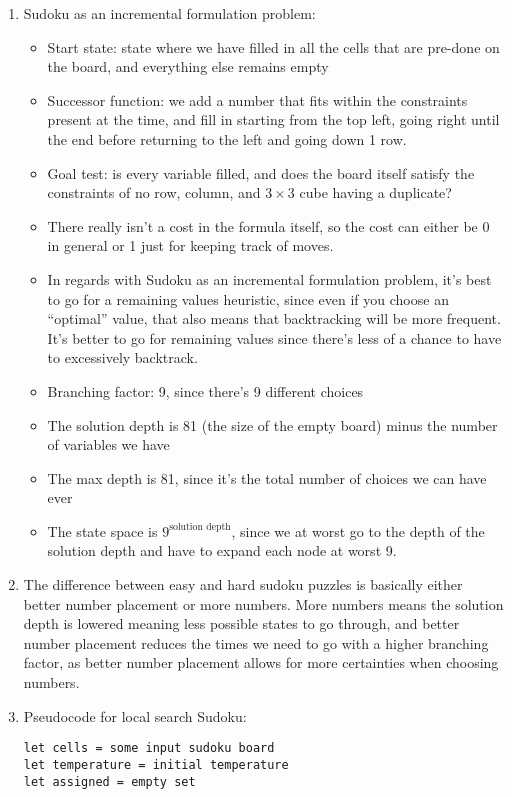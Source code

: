 \documentclass[12pt]{article}
\begin{document}
\begin{enumerate}[label={\large\textbf{\alph*)}}]
\item Sudoku as an incremental formulation problem:
\begin{itemize}
\item Start state: state where we have filled in all the cells that are pre-done on the board, and everything else remains empty
\item Successor function: we add a number that fits within the constraints present at the time, and fill in starting from the top left, going right until the end before returning to the left and going down 1 row.
\item Goal test: is every variable filled, and does the board itself satisfy the constraints of no row, column, and $3 \times 3$ cube having a duplicate?
\item There really isn't a cost in the formula itself, so the cost can either be 0 in general or 1 just for keeping track of moves.
\item In regards with Sudoku as an incremental formulation problem, it's best to go for a remaining values heuristic, since even if you choose an ``optimal'' value, that also means that backtracking will be more frequent. It's better to go for remaining values since there's less of a chance to have to excessively backtrack.
\item Branching factor: 9, since there's 9 different choices
\item The solution depth is 81 (the size of the empty board) minus the number of variables we have
\item The max depth is 81, since it's the total number of choices we can have ever
\item The state space is $9^{\text{solution depth}}$, since we at worst go to the depth of the solution depth and have to expand each node at worst 9.
\end{itemize}
\item The difference between easy and hard sudoku puzzles is basically either better number placement or more numbers. More numbers means the solution depth is lowered meaning less possible states to go through, and better number placement reduces the times we need to go with a higher branching factor, as better number placement allows for more certainties when choosing numbers.
\pagebreak
\item Pseudocode for local search Sudoku:
\begin{verbatim}
let cells = some input sudoku board
let temperature = initial temperature
let assigned = empty set


\end{verbatim}
\end{enumerate}
\end{document}
